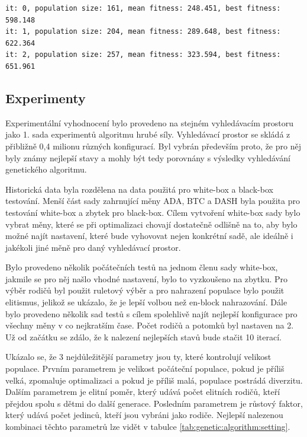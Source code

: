 \begin{lstlisting}[caption={~Rozšíření logu pro genetický algoritmus},label={lst:genetic:algorithm:log},captionpos=t,abovecaptionskip=-\medskipamount,belowcaptionskip=\medskipamount]
it: 0, population size: 161, mean fitness: 248.451, best fitness: 598.148
it: 1, population size: 204, mean fitness: 289.648, best fitness: 622.364
it: 2, population size: 257, mean fitness: 323.594, best fitness: 651.961
\end{lstlisting}

\subsection{Experimenty}
Experimentální vyhodnocení bylo provedeno na stejném vyhledávacím prostoru jako 1. sada experimentů algoritmu hrubé síly.
Vyhledávací prostor se skládá z přibližně 0,4 milionu různých konfigurací.
Byl vybrán především proto, že pro něj byly známy nejlepší stavy a mohly být tedy porovnány s výsledky vyhledávání genetického algoritmu.

Historická data byla rozdělena na data použitá pro white-box a black-box testování.
Menší část sady zahrnující měny ADA, BTC a DASH byla použita pro testování white-box a zbytek pro black-box.
Cílem vytvoření white-box sady bylo vybrat měny, které se při optimalizaci chovají dostatečně odlišně na to, aby bylo možné najít nastavení, které bude vyhovovat nejen konkrétní sadě, ale ideálně i jakékoli jiné měně pro daný vyhledávací prostor.

Bylo provedeno několik počátečních testů na jednom členu sady white-box, jakmile se pro něj našlo vhodné nastavení, bylo to vyzkoušeno na zbytku.
Pro výběr rodičů byl použit ruletový výběr a pro nahrazení populace bylo použit elitismus, jelikož se ukázalo, že je lepší volbou než en-block nahrazování.
Dále bylo provedeno několik sad testů s cílem spolehlivě najít nejlepší konfigurace pro všechny měny v co nejkratším čase.
Počet rodičů a potomků byl nastaven na 2.
Už od začátku se zdálo, že k nalezení nejlepších stavů bude stačit 10 iterací.

Ukázalo se, že 3 nejdůležitější parametry jsou ty, které kontrolují velikost populace.
Prvním parametrem je velikost počáteční populace, pokud je příliš velká, zpomaluje optimalizaci a pokud je příliš malá, populace postrádá diverzitu.
Dalším parametrem je elitní poměr, který udává počet elitních rodičů, kteří přejdou spolu s dětmi do další generace.
Posledním parametrem je růstový faktor, který udává počet jedinců, kteří jsou vybráni jako rodiče.
Nejlepší nalezenou kombinaci těchto parametrů lze vidět v tabulce \ref{tab:genetic:algorithm:setting}.

